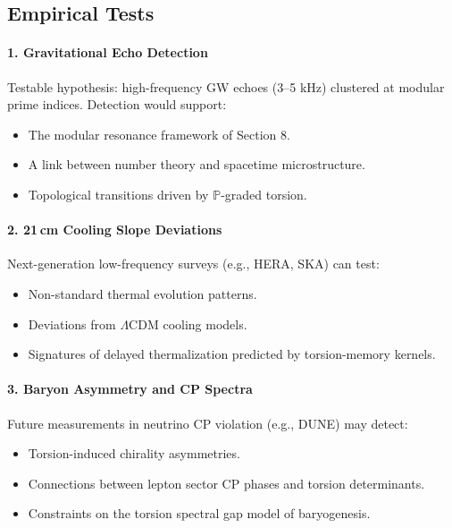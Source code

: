 \documentclass{article}
\theoremstyle{plain}
\begin{document}
\subsection{Empirical Tests}

\paragraph{1. Gravitational Echo Detection}

Testable hypothesis: high-frequency GW echoes (3–5 kHz) clustered at modular prime indices. Detection would support:
\begin{itemize}
    \item The modular resonance framework of Section 8.
    \item A link between number theory and spacetime microstructure.
    \item Topological transitions driven by $\mathbb{P}$-graded torsion.
\end{itemize}

\paragraph{2. 21 cm Cooling Slope Deviations}

Next-generation low-frequency surveys (e.g., HERA, SKA) can test:
\begin{itemize}
    \item Non-standard thermal evolution patterns.
    \item Deviations from $\Lambda$CDM cooling models.
    \item Signatures of delayed thermalization predicted by torsion-memory kernels.
\end{itemize}

\paragraph{3. Baryon Asymmetry and CP Spectra}

Future measurements in neutrino CP violation (e.g., DUNE) may detect:
\begin{itemize}
    \item Torsion-induced chirality asymmetries.
    \item Connections between lepton sector CP phases and torsion determinants.
    \item Constraints on the torsion spectral gap model of baryogenesis.
\end{itemize}
\end{document}
